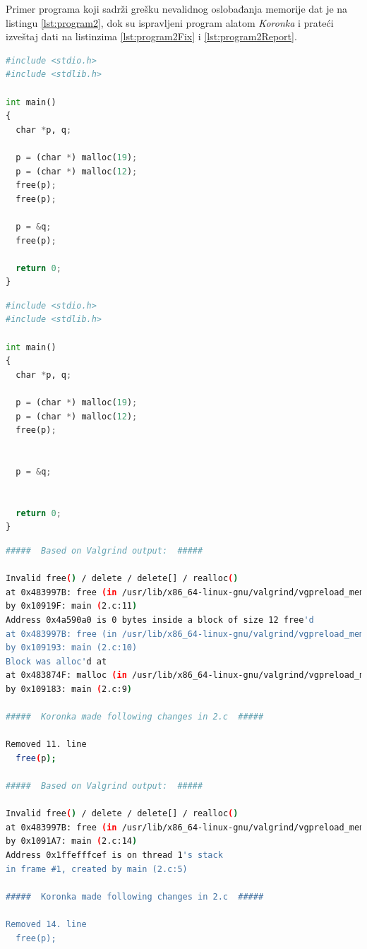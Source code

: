 \documentclass[12pt,oneside]{memoir}
\theoremstyle{plain}
\theoremstyle{definition}
\begin{document}
Primer programa koji sadrži grešku nevalidnog oslobađanja memorije dat je na listingu \ref{lst:program2}, dok su ispravljeni program alatom \textit{Koronka} i prateći izveštaj dati na listinzima \ref{lst:program2Fix} i \ref{lst:program2Report}.

\begin{lstlisting}[style=mystyle,caption={Program koji sadrži grešku nevalidnog oslobađanja memorije}, label={lst:program2},language={Python}] 
#include <stdio.h>
#include <stdlib.h>

int main()
{
  char *p, q;

  p = (char *) malloc(19);
  p = (char *) malloc(12);
  free(p);
  free(p);

  p = &q;
  free(p); 			
  				
  return 0;
}
\end{lstlisting}

\begin{lstlisting}[style=mystyle,caption={Ispravljeni program sa listinga \ref{lst:program2} alatom \textit{Koronka}}, label={lst:program2Fix},language={Python}] 
#include <stdio.h>
#include <stdlib.h>

int main()
{
  char *p, q;

  p = (char *) malloc(19);
  p = (char *) malloc(12);
  free(p);


  p = &q;

  				
  return 0;
}
\end{lstlisting}

\begin{lstlisting}[style=terminal,caption={Izveštaj o radu alata \textit{Koronka} za program sa listinga \ref{lst:program2}}, label={lst:program2Report},language={bash}]   
#####  Based on Valgrind output:  #####

Invalid free() / delete / delete[] / realloc()
at 0x483997B: free (in /usr/lib/x86_64-linux-gnu/valgrind/vgpreload_memcheck-amd64-linux.so)
by 0x10919F: main (2.c:11)
Address 0x4a590a0 is 0 bytes inside a block of size 12 free'd
at 0x483997B: free (in /usr/lib/x86_64-linux-gnu/valgrind/vgpreload_memcheck-amd64-linux.so)
by 0x109193: main (2.c:10)
Block was alloc'd at
at 0x483874F: malloc (in /usr/lib/x86_64-linux-gnu/valgrind/vgpreload_memcheck-amd64-linux.so)
by 0x109183: main (2.c:9)

#####  Koronka made following changes in 2.c  #####

Removed 11. line
  free(p);

#####  Based on Valgrind output:  #####

Invalid free() / delete / delete[] / realloc()
at 0x483997B: free (in /usr/lib/x86_64-linux-gnu/valgrind/vgpreload_memcheck-amd64-linux.so)
by 0x1091A7: main (2.c:14)
Address 0x1ffefffcef is on thread 1's stack
in frame #1, created by main (2.c:5)

#####  Koronka made following changes in 2.c  #####

Removed 14. line
  free(p); 			
\end{lstlisting}
\end{document}
